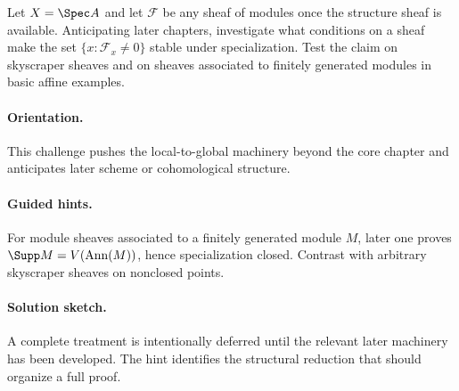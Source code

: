 \begin{problem}
Let $X=\Spec A$ and let $\mathcal F$ be any sheaf of modules once the structure sheaf is available. Anticipating later chapters, investigate what conditions on a sheaf make the set $\{x:\mathcal F_x\neq0\}$ stable under specialization. Test the claim on skyscraper sheaves and on sheaves associated to finitely generated modules in basic affine examples.
\end{problem}

\ifdefined\FullProblemDossiers
\paragraph{Orientation.}
This challenge pushes the local-to-global machinery beyond the core chapter and anticipates later scheme or cohomological structure.

\paragraph{Guided hints.}
For module sheaves associated to a finitely generated module $M$, later one proves $\Supp M=V(\operatorname{Ann}(M))$, hence specialization closed. Contrast with arbitrary skyscraper sheaves on nonclosed points.

\paragraph{Solution sketch.}
A complete treatment is intentionally deferred until the relevant later machinery has been developed. The hint identifies the structural reduction that should organize a full proof.
\fi
